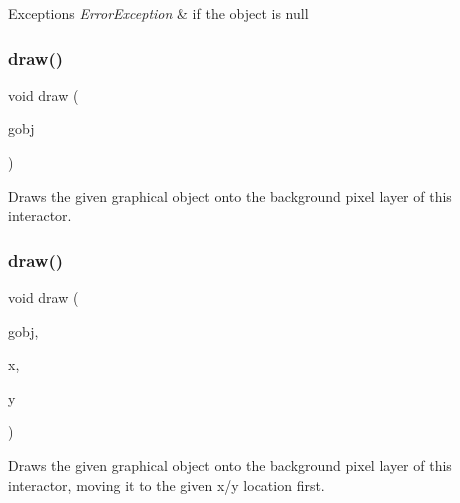 \begin{DoxyExceptions}{Exceptions}
{\em Error\+Exception} & if the object is null \\
\hline
\end{DoxyExceptions}
\mbox{\label{classsgl_1_1GDrawingSurface_a022a8d51c7fabcd79a0c809233e93453}} 
\subsubsection{\texorpdfstring{draw()}{draw()}\hspace{0.1cm}{\footnotesize\ttfamily [3/4]}}
{\footnotesize\ttfamily void draw (\begin{DoxyParamCaption}\item[{\mbox{\hyperlink{classsgl_1_1GObject}{G\+Object}} \&}]{gobj }\end{DoxyParamCaption})\hspace{0.3cm}{\ttfamily [virtual]}}



Draws the given graphical object onto the background pixel layer of this interactor. 

\mbox{\label{classsgl_1_1GDrawingSurface_a8af8762bd6720e0a1d2a84b190e3dc96}} 
\subsubsection{\texorpdfstring{draw()}{draw()}\hspace{0.1cm}{\footnotesize\ttfamily [4/4]}}
{\footnotesize\ttfamily void draw (\begin{DoxyParamCaption}\item[{\mbox{\hyperlink{classsgl_1_1GObject}{G\+Object}} \&}]{gobj,  }\item[{double}]{x,  }\item[{double}]{y }\end{DoxyParamCaption})\hspace{0.3cm}{\ttfamily [virtual]}}



Draws the given graphical object onto the background pixel layer of this interactor, moving it to the given x/y location first. 


